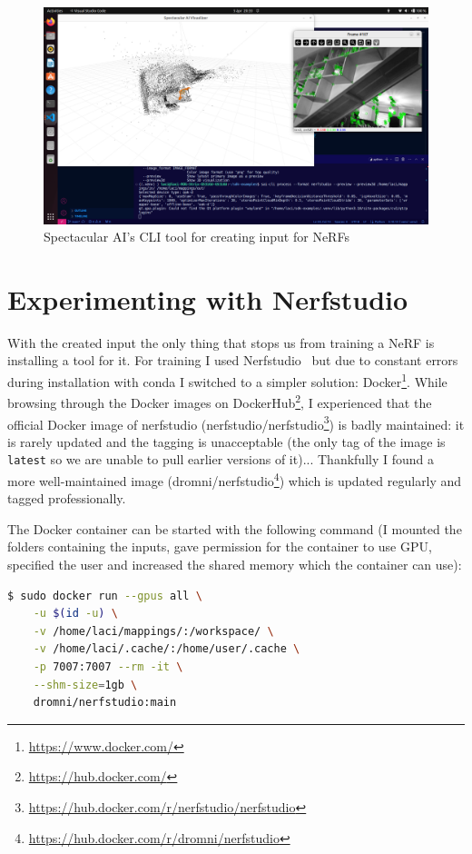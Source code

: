 \begin{figure}[htbp]
	\centering
	\includegraphics[width=150mm, keepaspectratio]{figures/sai-cli_process.png}
	\caption{Spectacular AI's CLI tool for creating input for NeRFs}
	\label{fig:sai_cli_process}
\end{figure}

\section{Experimenting with Nerfstudio}

With the created input the only thing that stops us from training a NeRF is installing a tool for it. For training I used Nerfstudio~\cite{nerfstudio} but due to constant errors during installation with conda I switched to a simpler solution: Docker\footnote{\url{https://www.docker.com/}}. While browsing through the Docker images on DockerHub\footnote{\url{https://hub.docker.com/}}, I experienced that the official Docker image of nerfstudio (nerfstudio/nerfstudio\footnote{\url{https://hub.docker.com/r/nerfstudio/nerfstudio}}) is badly maintained: it is rarely updated and the tagging is unacceptable (the only tag of the image is \verb|latest| so we are unable to pull earlier versions of it)... Thankfully I found a more well-maintained image (dromni/nerfstudio\footnote{\url{https://hub.docker.com/r/dromni/nerfstudio}}) which is updated regularly and tagged professionally.

The Docker container can be started with the following command (I mounted the folders containing the inputs, gave permission for the container to use GPU, specified the user and increased the shared memory which the container can use):

\FloatBarrier
\begin{lstlisting}[language=bash,frame=single,float=!ht]
$ sudo docker run --gpus all \
    -u $(id -u) \
    -v /home/laci/mappings/:/workspace/ \
    -v /home/laci/.cache/:/home/user/.cache \
    -p 7007:7007 --rm -it \
    --shm-size=1gb \
    dromni/nerfstudio:main
\end{lstlisting}

